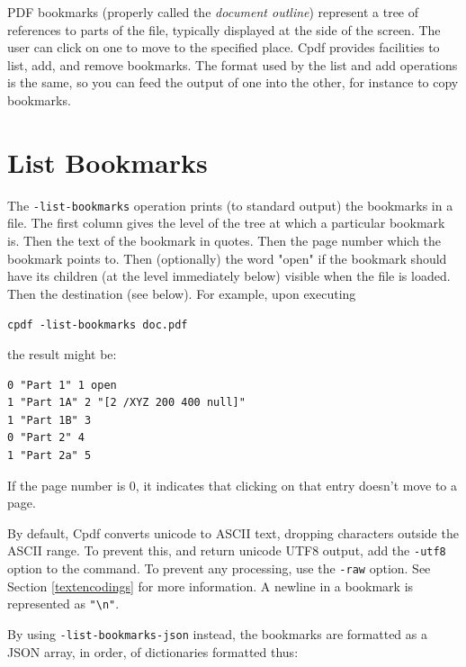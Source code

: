 \documentclass{book}
\begin{document}
  PDF bookmarks (properly called the \textit{document outline}) represent a tree
of references to parts of the file, typically displayed at the side of the
screen. The user can click on one to move to the specified place. Cpdf provides
facilities to list, add, and remove bookmarks. The format used by the list and
add operations is the same, so you can feed the output of one into the other,
for instance to copy bookmarks.

  \section{List Bookmarks}
  The \texttt{-list-bookmarks} operation prints (to standard output) the
bookmarks in a file. The first column gives the level of the tree at which a
particular bookmark is. Then the text of the bookmark in quotes. Then the page
number which the bookmark points to. Then (optionally) the word "open" if the
bookmark should have its children (at the level immediately below) visible when
the file is loaded. Then the destination (see below). For example, upon executing

\begin{framed}
  \noindent\small\verb!cpdf -list-bookmarks doc.pdf!
\end{framed}

\noindent the result might be:

\begin{framed}{\small\begin{verbatim}
0 "Part 1" 1 open
1 "Part 1A" 2 "[2 /XYZ 200 400 null]"
1 "Part 1B" 3
0 "Part 2" 4
1 "Part 2a" 5\end{verbatim}}\end{framed}

\noindent If the page number is 0, it indicates that clicking on that entry doesn't move to a page.

By default, Cpdf converts unicode to ASCII text, dropping characters outside
the ASCII range. To prevent this, and return unicode UTF8 output, add the
\texttt{-utf8} option to the command. To prevent any processing, use the
\texttt{-raw} option. See Section \ref{textencodings} for more information. A newline in a bookmark is represented as \texttt{"\textbackslash n"}.

By using \texttt{-list-bookmarks-json} instead, the bookmarks are formatted as a JSON array, in order, of dictionaries formatted thus:
\end{document}
